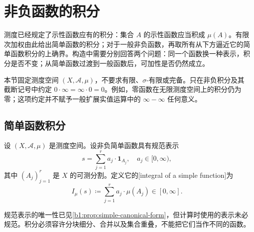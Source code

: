 \section{非负函数的积分}
\label{b1:sec:0501}

测度已经规定了示性函数应有的积分：集合 \(A\) 的示性函数应当积成 \(\mu(A)\)。有限次加权由此给出简单函数的积分；对于一般非负函数，再取所有从下方逼近它的简单函数积分的上确界。构造中需要分别回答两个问题：同一个函数换一种表示，积分是否不变；从简单函数过渡到一般函数后，可加性是否仍然成立。

\ProseParagraphBreak

本节固定测度空间 \((X,\mathcal A,\mu)\)，不要求有限、\(\sigma\)-有限或完备。只在非负积分及其截断记号中约定 \(0\cdot\infty=\infty\cdot0=0\)。例如，零函数在无限测度空间上的积分仍为零；这项约定并不赋予一般扩展实值运算中的 \(\infty-\infty\) 任何意义。

\subsection{简单函数积分}
\label{b1:subsec:050101}

\begin{definition}\label{b1:def:simple-integral}
设 \((X,\mathcal A,\mu)\) 是测度空间。设非负简单函数具有规范表示
\[
s=\sum_{j=1}^{r}a_j\cdot\mathbf1_{A_j},
\quad a_j\in[0,\infty),
\]
其中 \((A_j)_{j=1}^{r}\) 是 \(X\) 的可测分割。定义它的[integral of a simple function]为
\[
I_\mu(s)\coloneqq\sum_{j=1}^{r}a_j\cdot\mu(A_j)\in[0,\infty].
\]
\end{definition}

规范表示的唯一性已见\cref{b1:prop:simple-canonical-form}，但计算时使用的表示未必规范。积分必须容许分块细分、合并以及集合重叠，不能把它们当作不同的函数。

